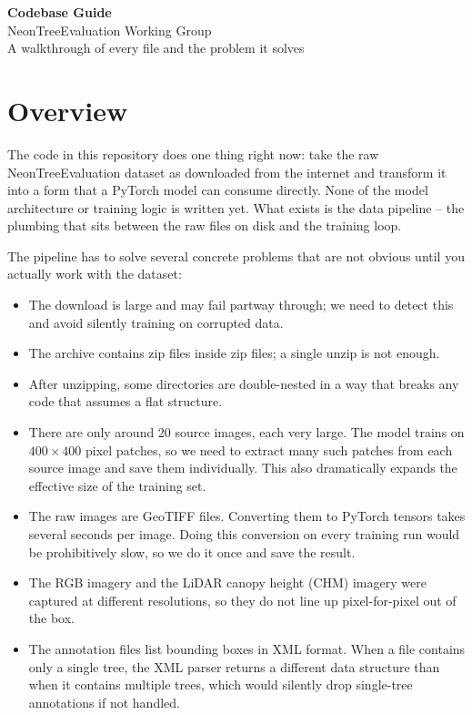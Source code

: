 \documentclass[11pt, a4paper]{article}
\begin{document}
\begin{center}
  {\LARGE\bfseries Codebase Guide}\\[0.4em]
  {\large NeonTreeEvaluation Working Group}\\[0.2em]
  {\normalsize\color{gray} A walkthrough of every file and the problem it solves}
\end{center}

\vspace{1em}
\tableofcontents
\vspace{1em}

\section{Overview}

The code in this repository does one thing right now: take the raw
NeonTreeEvaluation dataset as downloaded from the internet and transform it
into a form that a PyTorch model can consume directly. None of the model
architecture or training logic is written yet. What exists is the data
pipeline -- the plumbing that sits between the raw files on disk and the
training loop.

The pipeline has to solve several concrete problems that are not obvious until
you actually work with the dataset:

\begin{itemize}[nosep]
  \item The download is large and may fail partway through; we need to detect
        this and avoid silently training on corrupted data.
  \item The archive contains zip files inside zip files; a single unzip is not
        enough.
  \item After unzipping, some directories are double-nested in a way that
        breaks any code that assumes a flat structure.
  \item There are only around 20 source images, each very large. The model
        trains on $400 \times 400$ pixel patches, so we need to extract many
        such patches from each source image and save them individually. This
        also dramatically expands the effective size of the training set.
  \item The raw images are GeoTIFF files. Converting them to PyTorch tensors
        takes several seconds per image. Doing this conversion on every training
        run would be prohibitively slow, so we do it once and save the result.
  \item The RGB imagery and the LiDAR canopy height (CHM) imagery were captured
        at different resolutions, so they do not line up pixel-for-pixel out of
        the box.
  \item The annotation files list bounding boxes in XML format. When a file
        contains only a single tree, the XML parser returns a different data
        structure than when it contains multiple trees, which would silently
        drop single-tree annotations if not handled.
\end{itemize}
\end{document}
